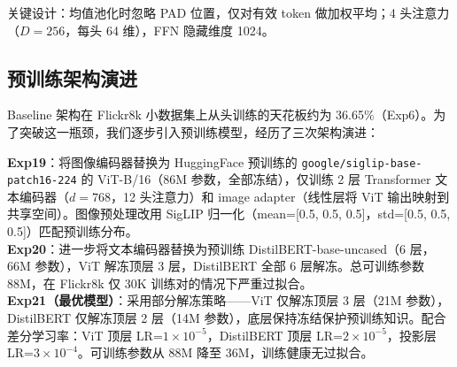 \documentclass[12pt,a4paper]{article}
\begin{document}
关键设计：均值池化时忽略 PAD 位置，仅对有效 token 做加权平均；4 头注意力（$D=256$，每头 64 维），FFN 隐藏维度 1024。

\subsection{预训练架构演进}

Baseline 架构在 Flickr8k 小数据集上从头训练的天花板约为 36.65\%（Exp6）。为了突破这一瓶颈，我们逐步引入预训练模型，经历了三次架构演进：

\begin{table}[H]
\centering
\caption{模型架构演进对比}
\end{table}

\noindent \textbf{Exp19}：将图像编码器替换为 HuggingFace 预训练的 \texttt{google/siglip-base-patch16-224} 的 ViT-B/16（86M 参数，全部冻结），仅训练 2 层 Transformer 文本编码器（$d=768$，12 头注意力）和 image adapter（线性层将 ViT 输出映射到共享空间）。图像预处理改用 SigLIP 归一化（mean=[0.5, 0.5, 0.5]，std=[0.5, 0.5, 0.5]）匹配预训练分布。\\

\noindent \textbf{Exp20}：进一步将文本编码器替换为预训练 DistilBERT-base-uncased（6 层，66M 参数），ViT 解冻顶层 3 层，DistilBERT 全部 6 层解冻。总可训练参数 88M，在 Flickr8k 仅 30K 训练对的情况下严重过拟合。\\

\noindent \textbf{Exp21（最优模型）}：采用部分解冻策略——ViT 仅解冻顶层 3 层（21M 参数），DistilBERT 仅解冻顶层 2 层（14M 参数），底层保持冻结保护预训练知识。配合差分学习率：ViT 顶层 LR=$1\times 10^{-5}$，DistilBERT 顶层 LR=$2\times 10^{-5}$，投影层 LR=$3\times 10^{-4}$。可训练参数从 88M 降至 36M，训练健康无过拟合。
\end{document}
